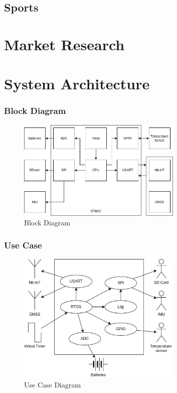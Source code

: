 \subsection{Sports}
\section{Market Research}



\section{System Architecture}


\subsubsection{Block Diagram}

\begin{figure}[H]
    \centering
    \includegraphics[width=0.7\textwidth]{images/diagrams/block_diagram/block_diagram_1/block_diagram.drawio.png}  %
    \caption{Block Diagram}
    \label{fig:Block Diagram}        
\end{figure}

\subsubsection{Use Case}

\begin{figure}[H]
    \centering
    \includegraphics[width=0.7\textwidth]{images/diagrams/use_case/Use Case.drawio.png}  %
    \caption{Use Case Diagram}
    \label{fig:Use Case Diagram}        
\end{figure}

